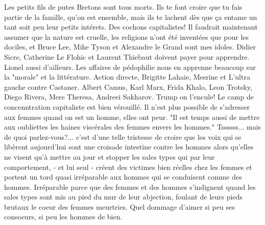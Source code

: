 \documentclass[11pt]{article} %
\begin{document}
Les petits fils de putes Bretons sont tous morts.
Ils te font croire que tu fais partie de la famille, qu'on est ensemble, mais ils te lachent dès que ça entame un tant soit peu leur petits intérets.
Des cochons capitalistes!
Il faudrait maintenant assumer que la nature est cruelle, les religions n'ont été inventées que pour les dociles, et Bruce Lee, Mike Tyson et Alexandre le Grand sont mes idoles.
Didier Sicre, Catherine Le Flohic et Laurent Thiebaut doivent payer pour apprendre. Lionel aussi d'ailleurs.
Les affaires de pédophilie nous en apprenne beaucoup sur la "morale" et la littérature.
Action directe, Brigitte Lahaie, Mesrine et L'ultra gauche contre Castaner.
Albert Camus, Karl Marx, Frida Khalo, Leon Trotsky, Diego Rivera, Mere Theresa, Andreei Sakharov.
Trump on l'encule!
Le camp de concenntration capitaliste est bien vérouillé.
Il n'est plus possible de s'adresser aux femmes quand on est un homme, elles ont peur.
"Il est temps aussi de mettre aux oubliettes les haines viscérales des femmes envers les hommes." Tssssss... mais de quoi parlez-vous?... c'est d'une telle tristesse de croire que les voix qui se libèrent aujourd'hui sont une croisade intestine contre les hommes alors qu'elles ne visent qu'à mettre au jour et stopper les sales types qui par leur comportement, - et lui seul - créent des victimes bien réelles chez les femmes et portent un tord quasi irréparable aux hommes qui se conduisent comme des hommes.
Irréparable parce que des femmes et des hommes s'indignent quand les sales types sont mis au pied du mur de leur abjection, foulant de leurs pieds brutaux le coeur des femmes meurtries.
Quel dommage d'aimer si peu ses consoeurs, si peu les hommes de bien.
\end{document}
